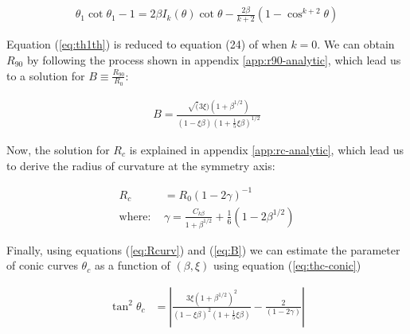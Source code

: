 \begin{align}
\theta_1\cot\theta_1 -1 = 2\beta I_k(\theta) \cot\theta - \frac{2\beta}{k+2}\left(1-\cos^{k+2}\theta\right)
\label{eq:th1th}
\end{align}

Equation (\ref{eq:th1th}) is reduced to equation (24) of \CRW{} when $k=0$.
We can obtain $R_{90}$ by following the process shown in appendix \ref{app:r90-analytic},
which lead us to a solution for $B \equiv \frac{R_{90}}{R_0}$:

\begin{align}
B = \frac{\sqrt(3\xi)\left(1+\beta^{1/2}\right)}{(1-\xi\beta)\left(1+\frac{1}{5}\xi\beta\right)^{1/2}}
\label{eq:B}
\end{align}

Now, the solution for $R_c$ is explained in appendix \ref{app:rc-analytic},
which lead us to derive the radius of curvature at the symmetry axis:

\begin{align}
R_c &= R_0\left(1-2\gamma\right)^{-1} \label{eq:Rcurv} \\
\mathrm{where:~} & \gamma = \frac{C_{k\beta}}{1+\beta^{1/2}}+\frac{1}{6}(1-2\beta^{1/2})
\end{align}

Finally, using equations (\ref{eq:Rcurv}) and (\ref{eq:B}) we can estimate the parameter of
conic curves $\theta_c$ as a function of $(\beta,\xi)$ using equation (\ref{eq:thc-conic})

\begin{align}
\tan^2\theta_c &= \left| \frac{3\xi\left(1+\beta^{1/2}\right)^2}{\left(1-\xi\beta\right)^2\left(1+\frac{1}{5}\xi\beta\right)}-\frac{2}{\left(1-2\gamma\right)}\right| 
\label{eq:thc-CRW}
\end{align}

